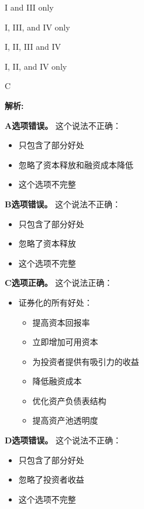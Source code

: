 \documentclass{article}
\newenvironment{explanation}
{\textbf{解析:}\par}
{\par}
\begin{document}
\begin{choices}
    \item I and III only
    \item I, III, and IV only
    \item I, II, III and IV
    \item I, II, and IV only
\end{choices}

\begin{correctanswer}
    C
\end{correctanswer}

\begin{explanation}
    \textbf{A选项错误。}
    这个说法不正确：
    \begin{itemize}
        \item 只包含了部分好处
        \item 忽略了资本释放和融资成本降低
        \item 这个选项不完整
    \end{itemize}

    \textbf{B选项错误。}
    这个说法不正确：
    \begin{itemize}
        \item 只包含了部分好处
        \item 忽略了资本释放
        \item 这个选项不完整
    \end{itemize}

    \textbf{C选项正确。}
    这个说法正确：
    \begin{itemize}
        \item 证券化的所有好处：
        \begin{itemize}
            \item 提高资本回报率
            \item 立即增加可用资本
            \item 为投资者提供有吸引力的收益
            \item 降低融资成本
            \item 优化资产负债表结构
            \item 提高资产池透明度
        \end{itemize}
    \end{itemize}

    \textbf{D选项错误。}
    这个说法不正确：
    \begin{itemize}
        \item 只包含了部分好处
        \item 忽略了投资者收益
        \item 这个选项不完整
    \end{itemize}
\end{explanation}
\end{document}
